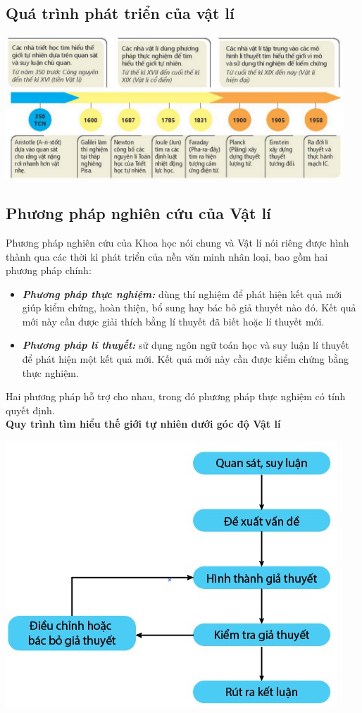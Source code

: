 \subsection{Quá trình phát triển của vật lí}
\begin{center}
	\includegraphics[width=0.95\textwidth]{../figs/G10-1-1}
\end{center}
\subsection{Phương pháp nghiên cứu của Vật lí}
Phương pháp nghiên cứu của Khoa học nói chung và Vật lí nói riêng được hình thành qua các thời kì phát triển của nền văn minh nhân loại, bao gồm hai phương pháp chính:
\begin{itemize}
	\item \textbf{\textit{Phương pháp thực nghiệm:}} dùng thí nghiệm để phát hiện kết quả mới giúp kiểm chứng, hoàn thiện, bổ sung hay bác bỏ giả thuyết nào đó. Kết quả mới này cần được giải thích bằng lí thuyết đã biết hoặc lí thuyết mới.
	\item \textbf{\textit{Phương pháp lí thuyết:}} sử dụng ngôn ngữ toán học và suy luận lí thuyết để phát hiện một kết quả mới. Kết quả mới này cần được kiểm chứng bằng thực nghiệm.
\end{itemize}
Hai phương pháp hỗ trợ cho nhau, trong đó phương pháp thực nghiệm có tính quyết định.\\
\textbf{Quy trình tìm hiểu thế giới tự nhiên dưới góc độ Vật lí}
\begin{center}
	\includegraphics[width=0.6\linewidth]{../figs/VN10-2023-PH-TP002-1}
\end{center}
